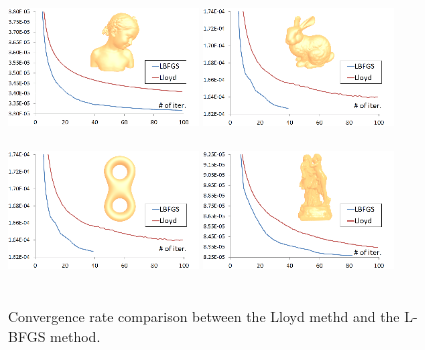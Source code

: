 \begin{figure}[htbp]
\centering
\includegraphics[width=0.45\textwidth]{figs/cvt/bimba_nf149k_2.png}
\includegraphics[width=0.45\textwidth]{figs/cvt/bunny_nf144k.png}\\
\\
\includegraphics[width=0.45\textwidth]{figs/cvt/eight.png}
\includegraphics[width=0.45\textwidth]{figs/cvt/sculpture.png}\\
\\
\caption{Convergence rate comparison between the Lloyd methd and the
L-BFGS method.} \label{fig:lbfgs_plot}
\end{figure}

